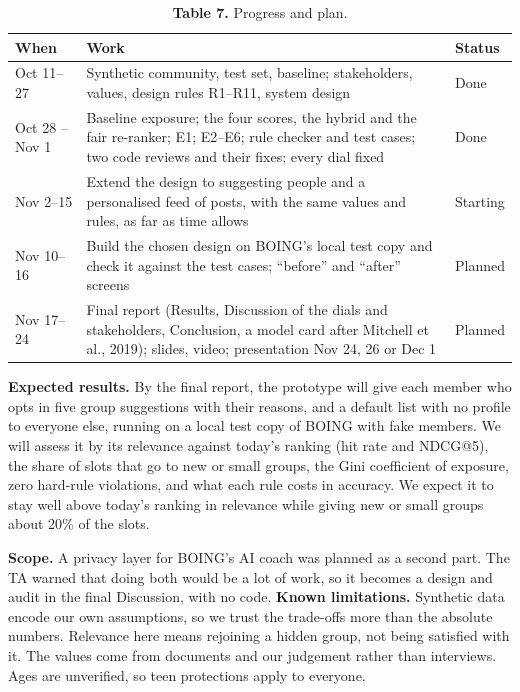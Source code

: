 \documentclass[11pt,letterpaper]{article}
\newcommand{\rowrule}{\midrule[0.2pt]}
\begin{document}
\begin{table}[!htbp]
\centering
\caption*{\textbf{Table 7.} Progress and plan.}
\scriptsize
\begin{tabular}{
  >{\raggedright\arraybackslash}p{}
  >{\raggedright\arraybackslash}p{}
  >{\raggedright\arraybackslash}p{}
}
\toprule
\textbf{When} & \textbf{Work} & \textbf{Status} \\
\midrule
Oct 11--27 & Synthetic community, test set, baseline; stakeholders, values, design rules R1--R11, system design & Done \\
\rowrule
Oct 28 -- Nov 1 & Baseline exposure; the four scores, the hybrid and the fair re-ranker; E1; E2--E6; rule checker and test cases; two code reviews and their fixes; every dial fixed & Done \\
\rowrule
Nov 2--15 & Extend the design to suggesting people and a personalised feed of posts, with the same values and rules, as far as time allows & Starting \\
\rowrule
Nov 10--16 & Build the chosen design on BOING's local test copy and check it against the test cases; ``before'' and ``after'' screens & Planned \\
\rowrule
Nov 17--24 & Final report (Results, Discussion of the dials and stakeholders, Conclusion, a model card after Mitchell et al., 2019); slides, video; presentation Nov 24, 26 or Dec 1 & Planned \\
\bottomrule
\end{tabular}
\end{table}

\textbf{Expected results.} By the final report, the prototype will give each member who opts in five group
suggestions with their reasons, and a default list with no profile to everyone else, running on a local test
copy of BOING with fake members. We will assess it by its relevance against today's ranking (hit rate and
NDCG@5), the share of slots that go to new or small groups, the Gini coefficient of exposure, zero hard-rule
violations, and what each rule costs in accuracy. We expect it to stay well above today's ranking in relevance
while giving new or small groups about 20\% of the slots.

\textbf{Scope.} A privacy layer for BOING's AI coach was planned as a second part. The TA warned that doing
both would be a lot of work, so it becomes a design and audit in the final Discussion, with no code.
\textbf{Known limitations.} Synthetic data encode our own assumptions, so we trust the trade-offs more than
the absolute numbers. Relevance here means rejoining a hidden group, not being satisfied with it. The values
come from documents and our judgement rather than interviews. Ages are unverified, so teen protections apply
to everyone.
\end{document}
